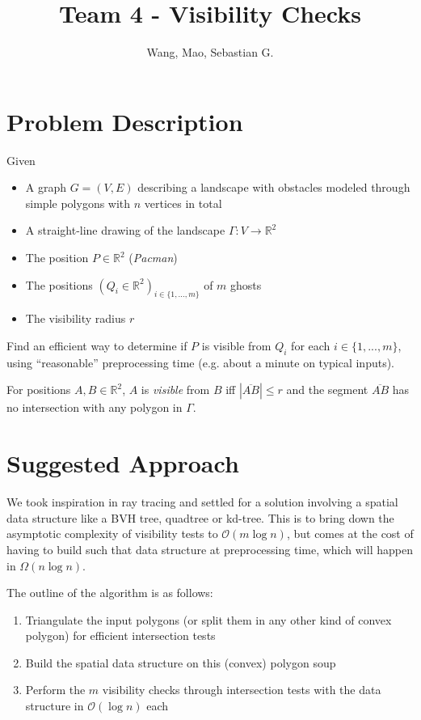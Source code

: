 \documentclass{article}
\begin{document}
\title{Team 4 - Visibility Checks}
\author{Wang, Mao, Sebastian G.}

\maketitle

\section{Problem Description}
Given
\begin{itemize}
  \setlength{\itemsep}{-2pt}
  \item A graph $G=(V,E)$ describing a landscape with obstacles modeled through simple polygons with $n$ vertices in total
  \item A straight-line drawing of the landscape $\Gamma : V \rightarrow \mathds{R}^2$
  \item The position $P \in \mathds{R}^2$ (\textit{Pacman})
  \item The positions $(Q_i \in \mathds{R}^2)_{i \in \{1, ..., m\}}$ of $m$ ghosts
  \item The visibility radius $r$
\end{itemize}
Find an efficient way to determine if $P$ is visible from $Q_i$ for each
$i \in \{1, ..., m\}$, using ``reasonable'' preprocessing time
(e.g. about a minute on typical inputs).
\par\bigskip

For positions $A, B \in \mathds{R}^2$, $A$ is \textit{visible} from $B$ iff
$|\overline{AB}| \leq r$ and the segment $\overline{AB}$ has no intersection with any polygon in $\Gamma$.

\section{Suggested Approach}

We took inspiration in ray tracing and settled for a solution involving a spatial
data structure like a BVH tree, quadtree or kd-tree. This is to bring down the
asymptotic complexity of visibility tests to $\mathcal{O}(m\log n)$, but comes
at the cost of having to build such that data structure at preprocessing time, which
will happen in $\Omega(n\log n)$.
\par\bigskip

The outline of the algorithm is as follows:

\begin{enumerate}
  \setlength{\itemsep}{-2pt}
  \item Triangulate the input polygons (or split them in any other kind of convex polygon) for efficient intersection tests
  \item Build the spatial data structure on this (convex) polygon soup
  \item Perform the $m$ visibility checks through intersection tests with the data structure in $\mathcal{O}(\log n)$ each
\end{enumerate}
\end{document}
